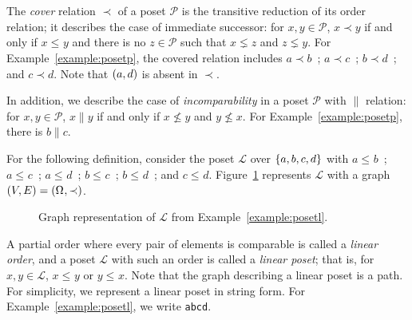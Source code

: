 \documentclass[12pt]{llncs}
\DeclarePairedDelimiter{\set}{\{}{\}}
\DeclarePairedDelimiter{\tuple}{(}{)}
\let\oldleq\leq
\renewcommand{\leq}[1][]{\oldleq_{#1}}
\newcommand{\poset}[1]{\mathcal{#1}}
\newcommand{\uni}[1][]{\Omega_{#1}}
\newcommand{\lin}[1]{\texttt{#1}}
\newcommand{\incomp}{\parallel}
\newcommand{\covered}{\prec}
\begin{document}
The \emph{cover} relation $\covered$ of a poset $\poset{P}$ is the transitive reduction of its order relation; it describes the case of immediate successor: for $x, y \!\in\! \poset{P}$, $x \covered y$ if and only if $x \leq y$ and there is no $z \!\in\! \poset{P}$ such that $x \lneq z$ and $z \lneq y$. For Example~\ref{example:posetp}, the covered relation includes $a \covered b$\ ; $a \covered c$\ ; $b \covered d$\ ; and $c \covered d$. Note that $\tuple{a,d}$ is absent in $\covered$.

In addition, we describe the case of \emph{incomparability} in a poset $\poset{P}$ with $\incomp$ relation: for $x, y \!\in\! \poset{P}$, $x \incomp y$ if and only if $x \nleq y$ and $y \nleq x$. For Example~\ref{example:posetp}, there is $b \incomp c$.

\begin{example}
    For the following definition, consider the poset $\poset{L}$ over $\set{a,b,c,d}$ with $a \leq b$\ ; $a \leq c$\ ; $a \leq d$\ ; $b \leq c$\ ; $b \leq d$\ ; and $c \leq d$. Figure~\ref{figure:posetl} represents $\poset{L}$ with a graph $\tuple{V,E} = \tuple{\uni,\covered}$.
    \label{example:posetl}
\end{example}

\vspace{-15px}
\begin{figure}
    \centering
    \caption{Graph representation of $\poset{L}$ from Example~\ref{example:posetl}.}
    \label{figure:posetl}
\end{figure}
\vspace{-15px}

A partial order where every pair of elements is comparable is called a \emph{linear order}, and a poset $\poset{L}$ with such an order is called a \emph{linear poset}; that is, for $x, y \!\in\! \poset{L}$, $x \leq y$ or $y \leq x$. Note that the graph describing a linear poset is a path. For simplicity, we represent a linear poset in string form. For Example~\ref{example:posetl}, we write \lin{abcd}.
\end{document}
